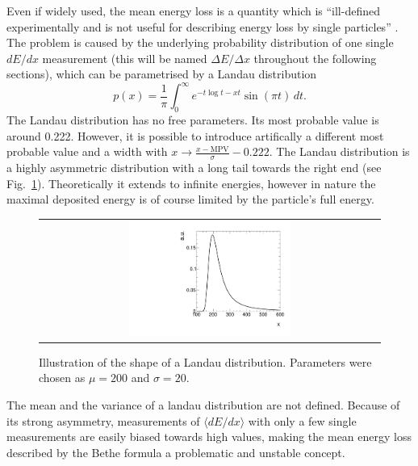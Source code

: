 Even if widely used, the mean energy loss is a quantity which is ``ill-defined experimentally and is not useful for describing energy loss by single particles'' \cite{bib:PDG_2014}.
The problem is caused by the underlying probability distribution of one single $dE/dx$ measurement (this will be named $\Delta E/ \Delta x $ throughout the following sections), which can be parametrised by a Landau distribution \cite{bib:Landau_1944}
\begin{equation*}
p(x) = \frac{1}{\pi} \int_0^\infty\! e^{-t \log t - x t} \sin(\pi t)\, dt.
\end{equation*}
The Landau distribution has no free parameters. Its most probable value is around 0.222.
However, it is possible to introduce artifically a different most probable value and a width with $x \rightarrow \frac{x-\text{MPV}}{\sigma}-0.222$.
The Landau distribution is a highly asymmetric distribution with a long tail towards the right end (see Fig.~\ref{fig:landau}).
Theoretically it extends to infinite energies, however in nature the maximal deposited energy is of course limited by the particle's full energy.
\begin{figure}[!b]
  \centering 
  \begin{tabular}{c}
  \includegraphics[width=0.49\textwidth]{figures/analysis/PixelCalibration/Landau.pdf}
  \end{tabular}
  \caption{Illustration of the shape of a Landau distribution. Parameters were chosen as $\mu=200$ and $\sigma=20$.} 
  \label{fig:landau}
\end{figure}
The mean and the variance of a landau distribution are not defined.
Because of its strong asymmetry, measurements of $\langle dE/dx \rangle$ with only a few single measurements are easily biased towards high values, making the mean energy loss described by the Bethe formula a problematic and unstable concept. 


